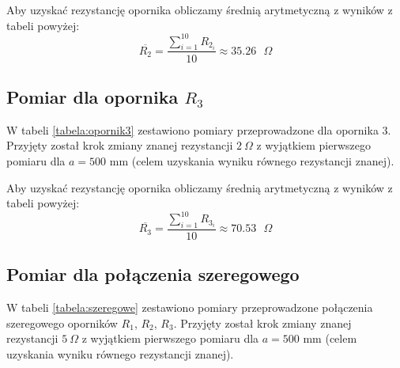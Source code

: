 \documentclass[a4paper,12pts]{article}
\begin{document}
	Aby uzyskać rezystancję opornika obliczamy średnią arytmetyczną z wyników z tabeli powyżej:
	\begin{equation}
	\overline{R_2} = \frac{\sum_{i = 1}^{10} R_{2_i}}{10} \approx 35.26 \textrm{ $\Omega$}
	\end{equation}
	
	
	\subsection{Pomiar dla opornika $R_3$}
	W tabeli \ref{tabela:opornik3} zestawiono pomiary przeprowadzone dla opornika 3. Przyjęty został krok zmiany znanej rezystancji $2 ~\Omega$ z wyjątkiem pierwszego pomiaru dla $a = 500$ mm (celem uzyskania wyniku równego rezystancji znanej).
	
	\begin{table}[!h]
		\centering
		\caption{Wyniki pomiarów dla opornika nr 3}
		\label{tabela:opornik3}
	\end{table}
	
	Aby uzyskać rezystancję opornika obliczamy średnią arytmetyczną z wyników z tabeli powyżej:
	\begin{equation}
	\overline{R_3} = \frac{\sum_{i = 1}^{10} R_{3_i}}{10} \approx 70.53 \textrm{ $\Omega$}
	\end{equation}
	
	
	\subsection{Pomiar dla połączenia szeregowego}
	W tabeli \ref{tabela:szeregowe} zestawiono pomiary przeprowadzone połączenia szeregowego oporników $R_1$, $R_2$, $R_3$. Przyjęty został krok zmiany znanej rezystancji $5 ~\Omega$ z wyjątkiem pierwszego pomiaru dla $a = 500$ mm (celem uzyskania wyniku równego rezystancji znanej).
	
\end{document}
